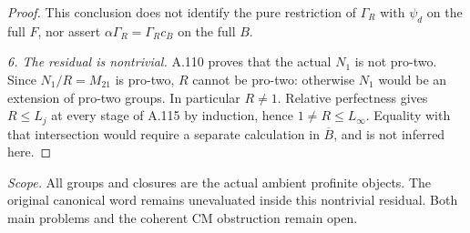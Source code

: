 \begin{proof}
This conclusion does not identify the pure restriction of
\(\Gamma_R\) with \(\psi_d\) on the full \(F\), nor assert
\(\alpha\Gamma_R=\Gamma_Rc_B\) on the full \(B\).

\medskip\noindent\emph{6. The residual is nontrivial.}
A.110 proves that the actual \(N_1\) is not pro-two.
Since \(N_1/R=M_{21}\) is pro-two, \(R\) cannot be pro-two: otherwise
\(N_1\) would be an extension of pro-two groups. In particular
\(R\ne1\). Relative perfectness gives \(R\le L_j\) at every
stage of A.115 by induction, hence \(1\ne R\le L_\infty\).
Equality with that intersection would require a separate calculation
in \(\overline B\), and is not inferred here.
\end{proof}
\noindent\emph{Scope.}
All groups and closures are the actual ambient profinite objects.
The original canonical word remains unevaluated inside this nontrivial
residual. Both main problems and the coherent CM obstruction remain open.
